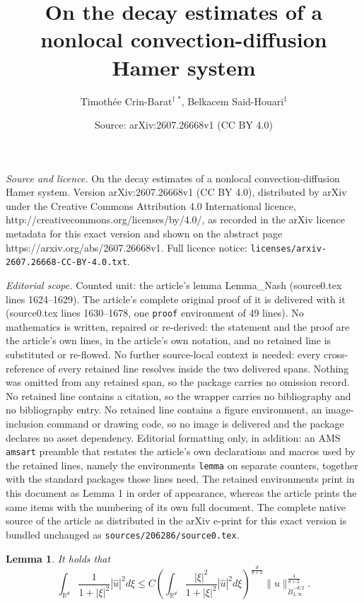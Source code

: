 \documentclass[10pt,a4paper]{amsart}
\title{On the decay estimates of a nonlocal convection-diffusion Hamer system}
\author{Timoth\'ee Crin-Barat$^\dagger\, ^*$, Belkacem Said-Houari$^\ddag$}
\date{Source: arXiv:2607.26668v1 (CC BY 4.0)}
\newtheorem{lemma}{Lemma}
\newcommand{\R}{\mathbb{R}}
\begin{document}
\maketitle

\noindent\emph{Source and licence.} On the decay estimates of a nonlocal convection-diffusion Hamer system. Version arXiv:2607.26668v1 (CC BY 4.0), distributed by arXiv under the Creative Commons Attribution 4.0 International licence, http://creativecommons.org/licenses/by/4.0/, as recorded in the arXiv licence metadata for this exact version and shown on the abstract page https://arxiv.org/abs/2607.26668v1. Full licence notice: \texttt{licenses/arxiv-2607.26668-CC-BY-4.0.txt}.\par\smallskip

\noindent\textit{Editorial scope.} Counted unit: the article's lemma Lemma\_Nash (source0.tex lines 1624--1629). The article's complete original proof of it is delivered with it (source0.tex lines 1630--1678, one \texttt{proof} environment of 49 lines). No mathematics is written, repaired or re-derived: the statement and the proof are the article's own lines, in the article's own notation, and no retained line is substituted or re-flowed.  No further source-local context is needed: every cross-reference of every retained line resolves inside the two delivered spans.  Nothing was omitted from any retained span, so the package carries no omission record.  No retained line contains a citation, so the wrapper carries no bibliography and no bibliography entry.  No retained line contains a figure environment, an image-inclusion command or drawing code, so no image is delivered and the package declares no asset dependency.  Editorial formatting only, in addition: an AMS \texttt{amsart} preamble that restates the article's own declarations and macros used by the retained lines, namely the environments \texttt{lemma} on separate counters, together with the standard packages those lines need.  The retained environments print in this document as Lemma 1 in order of appearance, whereas the article prints the same items with the numbering of its own full document.  The complete native source of the article as distributed in the arXiv e-print for this exact version is bundled unchanged as \texttt{sources/206286/source0.tex}.
\begin{lemma}\label{Lemma_Nash}
It holds that
\begin{equation}
\int_{\R^d}\frac{1}{1+|\xi|^2}|\hat{u}|^2d\xi\leq C \left(\int_{\R^d}\frac{|\xi|^2}{1+|\xi|^2}|\hat{u}|^2 d\xi\right)^{\frac{d}{d+2}}\|u\|_{\dot{{B}}_{2,\infty}^{-d/2}}^{\frac{4}{d+2}}. 
\end{equation} 
\end{lemma}
\end{document}
